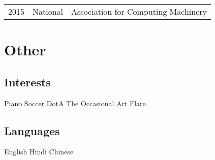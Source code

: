 \documentclass[]{deedy-resume-openfont}
\begin{document}
\begin{minipage}[t]{0.66\textwidth}
\begin{tabular}{rll}
2015         & National  & Association for Computing Machinery\\
\end{tabular}

\sectionsep


\section{Other} 
\subsection{Interests}
Piano \textbullet{} Soccer \textbullet{} DotA \textbullet{} The Occasional Art Flare \\
\sectionsep
\subsection{Languages}
English \textbullet{} Hindi \textbullet{} Chinese
\sectionsep

\end{minipage} 
\end{document}
